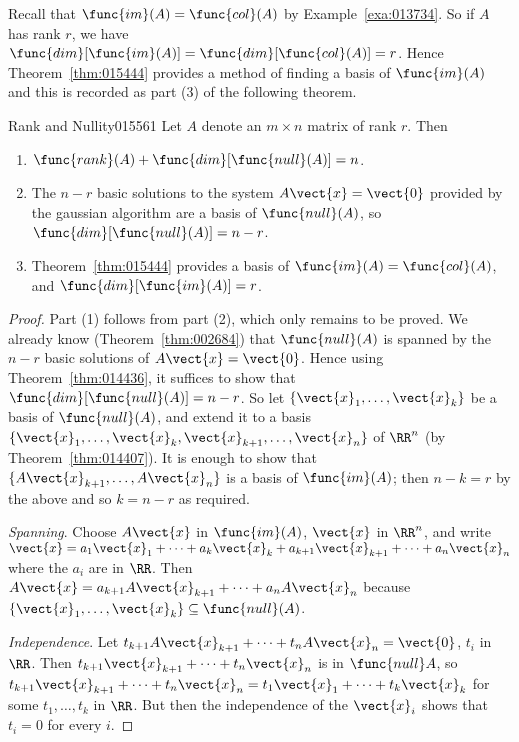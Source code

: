 Recall that  $\func{im}(A) = \func{col}(A)$ by Example~\ref{exa:013734}. So if $A$ has rank $r$, we have  $\func{dim}[\func{im}(A)] = \func{dim}[\func{col}(A)] =  r$. Hence Theorem~\ref{thm:015444} provides a method of finding a basis of $\func{im}(A)$ and this is recorded as part (3) of the following theorem.

\begin{theorem}{Rank and Nullity}{015561} %
Let $A$ denote an $m \times n$ matrix of rank $r$. Then

\begin{enumerate}
\item $ \func{rank}(A) +  \func{dim}[\func{null}(A)] =n$.

\item  The $n - r$ basic solutions to the system $A\vect{x} = \vect{0}$ provided by the gaussian algorithm are a basis of $\func{null}(A)$, so $\func{dim}[\func{null}(A)] = n - r$.

\item Theorem~\ref{thm:015444} provides a basis of $\func{im}(A) = \func{col}(A)$, and $\func{dim}[\func{im}(A)] = r$.
\end{enumerate}
\end{theorem}

\begin{proof}
Part (1) follows from part (2), which only remains to be proved. We already know (Theorem~\ref{thm:002684}) that $\func{null}(A)$ is spanned by the $n - r$ basic solutions of $A\vect{x} = \vect{0}$. Hence using Theorem~\ref{thm:014436}, it suffices to show that $\func{dim}[\func{null}(A)] = n - r$. So let $\{\vect{x}_{1}, \dots, \vect{x}_{k}\}$ be a basis of $\func{null}(A)$, and extend it to a basis $\{\vect{x}_{1}, \dots, \vect{x}_{k}, \vect{x}_{k+1}, \dots, \vect{x}_{n}\}$ of $\RR^n$ (by Theorem~\ref{thm:014407}). It is enough to show that $\{A\vect{x}_{k+1}, \dots, A\vect{x}_{n}\}$ is a basis of $\func{im}(A)$; then $n - k = r$ by the above and so $k = n - r$ as required.

\textit{Spanning}. Choose $A\vect{x}$ in $\func{im}(A)$, $\vect{x}$ in
$\RR^n$, and write $\vect{x} = a_{1}\vect{x}_{1} + \dots + a_{k}\vect{x}_{k} + a_{k+1}\vect{x}_{k+1} + \dots + a_{n}\vect{x}_{n}$ where the $a_{i}$ are in $\RR$.
Then $A\vect{x} = a_{k+1}A\vect{x}_{k+1} + \dots + a_{n}A\vect{x}_{n}$ because $\{\vect{x}_{1}, \dots, \vect{x}_{k}\} \subseteq \func{null}(A)$.

\textit{Independence}. Let $t_{k+1}A\vect{x}_{k+1} + \dots + t_{n}A\vect{x}_{n} = \vect{0}$, $t_{i}$ in $\RR$. Then $t_{k+1}\vect{x}_{k+1} + \dots + t_{n}\vect{x}_{n}$ is in $\func{null} A$, so $t_{k+1}\vect{x}_{k+1} + \dots + t_{n}\vect{x}_{n} = t_{1}\vect{x}_{1} + \dots + t_{k}\vect{x}_{k}$ for some $t_{1}, \dots, t_{k}$ in $\RR$. But then the independence of the $\vect{x}_{i}$ shows that $t_{i} = 0$ for every $i$.
\end{proof}

